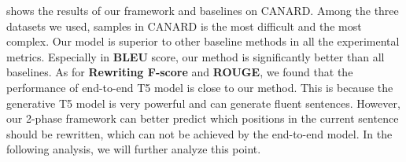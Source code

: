  shows the results of our framework and baselines on CANARD. Among the three datasets we used, samples in CANARD is the most difficult and the most complex. 
Our model is superior to other baseline methods
in all the experimental metrics. 
Especially in \textbf{BLEU} score, 
our method is significantly 
better 
than all baselines. 
As for \textbf{Rewriting F-score} and \textbf{ROUGE}, we found that the
performance of 
 end-to-end T5 model is close to 
our method. 
This is because the generative T5 model is very powerful and can generate fluent sentences. However, our 2-phase framework can better predict which positions in the current sentence should be rewritten, which
can not be achieved by the end-to-end model.
In the following analysis, we will further analyze this point.




\begin{table}[ht!]
\setlength\tabcolsep{3pt}
\centering
\scriptsize
\caption{Results on CQR.}
\label{tab:cqr-result}
\end{table}



